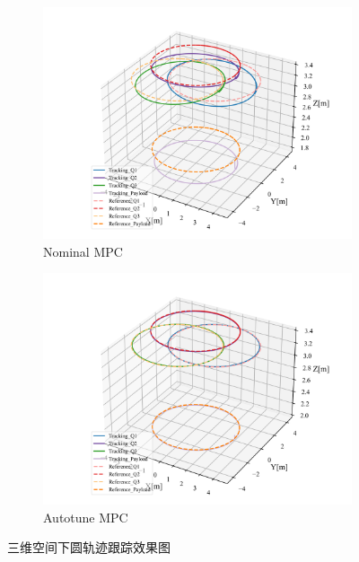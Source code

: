 \documentclass[lang=chs, degree=master, blindreview=false, winfonts=true]{yanputhesis}
\begin{document}
\begin{figure}[H]
    \centering
    \begin{subfigure}[b]{0.49\textwidth}
        \centering
        \includegraphics[width=\textwidth]{picture/kk2/3D.png} 
        \caption{Nominal MPC} 
        \label{3D1}
    \end{subfigure}
	\hspace{0.0\textwidth}
    \begin{subfigure}[b]{0.49\textwidth}
        \centering
        \includegraphics[width=\textwidth]{picture/kk2/plot3D.png} 
        \caption{Autotune MPC}  
        \label{3D2}
    \end{subfigure}
    \caption{三维空间下圆轨迹跟踪效果图}
    \label{combined3D}
\end{figure}
\end{document}
